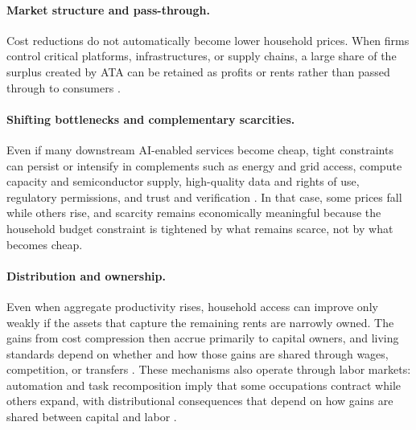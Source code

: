 \documentclass[11pt]{article}
\begin{document}
\paragraph{Market structure and pass-through.}
Cost reductions do not automatically become lower household prices. When firms control critical platforms, infrastructures, or supply chains, a large share of the surplus created by ATA can be retained as profits or rents rather than passed through to consumers \citep{OECD2025AIInfra}.

\paragraph{Shifting bottlenecks and complementary scarcities.}
Even if many downstream AI-enabled services become cheap, tight constraints can persist or intensify in complements such as energy and grid access, compute capacity and semiconductor supply, high-quality data and rights of use, regulatory permissions, and trust and verification \citep{OECD2025AIInfra, Sastry2024ComputeGovernance, IEA2025EnergyAI}. In that case, some prices fall while others rise, and scarcity remains economically meaningful because the household budget constraint is tightened by what remains scarce, not by what becomes cheap.

\paragraph{Distribution and ownership.}
Even when aggregate productivity rises, household access can improve only weakly if the assets that capture the remaining rents are narrowly owned. The gains from cost compression then accrue primarily to capital owners, and living standards depend on whether and how those gains are shared through wages, competition, or transfers \citep{IMF2024}. These mechanisms also operate through labor markets: automation and task recomposition imply that some occupations contract while others expand, with distributional consequences that depend on how gains are shared between capital and labor \citep{IMF2024}.
\end{document}
